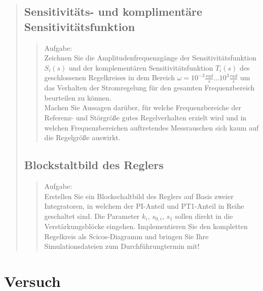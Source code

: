 \begin{quote}
    \subsection{Sensitivitäts- und komplimentäre Sensitivitätsfunktion}
    \begin{quote}
        Aufgabe:\\
        Zeichnen Sie die Amplitudenfrequenzgänge der Sensitivitätsfunktion $S_i(s)$ und der komplementären
        Sensitivitätsfunktion $T_i (s)$ des geschlossenen Regelkreises in dem Bereich $\omega = 10^{-3}\frac{rad}{s}
        \ldots 10^{3}\frac{rad}{s}$ um das Verhalten der Stromregelung für den gesamten Frequenzbereich beurteilen zu
        können.\\
        Machen Sie Aussagen darüber, für welche Frequenzbereiche der Referenz- und Störgröße gutes Regelverhalten
        erzielt wird und in welchen Frequenzbereichen auftretendes Messrauschen sich kaum auf die Regelgröße auswirkt.\\
        
                        
	\end{quote}
		
	\subsection{Blockstaltbild des Reglers}
    \begin{quote}
        Aufgabe:\\
        Erstellen Sie ein Blockschaltbild des Reglers auf Basis zweier Integratoren, in welchem der PI-Anteil und PT1-Anteil in Reihe geschaltet
        sind. Die Parameter $k_i$, $s_{0,i}$, $s_1$ sollen direkt in die Verstärkungsblöcke eingehen. Implementieren Sie
        den kompletten Regelkreis als Scicos-Diagramm und bringen Sie Ihre Simulationsdateien zum Durchführungtermin
        mit!
        
	 	
    \end{quote}
    
  
\end{quote}


\section{Versuch}
\begin{quote}
    
\end{quote}

